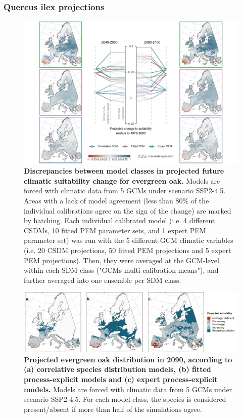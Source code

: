 \clearpage

\subsubsection{Quercus ilex projections}

\begin{figure}[htpb]
\centering
\includegraphics{chapter4/figs/quercusilex_cascade-1.pdf}
\caption{\textbf{Discrepancies between model classes in projected future climatic suitability change for evergreen oak.} Models are forced with climatic data from 5 GCMs under scenario SSP2-4.5. Areas with a lack of model agreement (less than 80\% of the individual calibrations agree on the sign of the change) are marked by hatching. Each individual calibrated model (i.e. 4 different CSDMs, 10 fitted PEM parameter sets, and 1 expert PEM parameter set) was run with the 5 different GCM climatic variables (i.e. 20 CSDM projections, 50 fitted PEM projections and 5 expert PEM projections). Then, they were averaged at the GCM-level within each SDM class ("GCMs multi-calibration means"), and further averaged into one ensemble per SDM class.}
\label{app:qileproj}
\end{figure}

\begin{figure}[htpb]
\centering
\vspace*{-0.2cm}
\includegraphics{chapter4/figs/quercusilex_distributions-1.pdf}
\caption{\textbf{Projected evergreen oak distribution in 2090, according to (a) correlative species distribution models, (b) fitted process-explicit models and (c) expert process-explicit models.} Models are forced with climatic data from 5 GCMs under scenario SSP2-4.5. For each model class, the species is considered present/absent if more than half of the simulations agree.}
\label{app:qiledist}
\vspace*{-6cm}
\end{figure}

